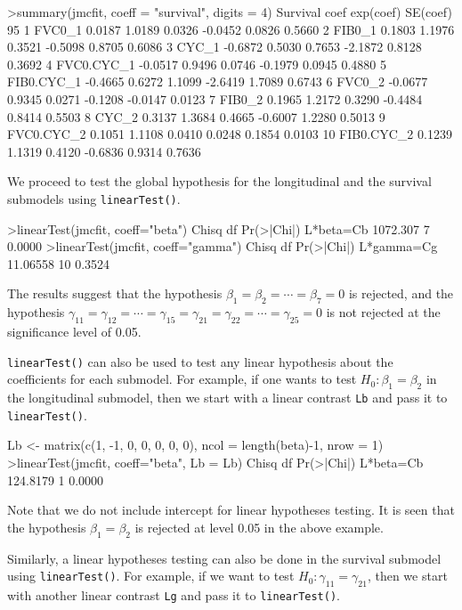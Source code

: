 \begin{example}
>summary(jmcfit, coeff = "survival", digits = 4)
     Survival    coef exp(coef) SE(coef) 95%
1      FVC0_1  0.0187    1.0189   0.0326  -0.0452   0.0826   0.5660
2      FIB0_1  0.1803    1.1976   0.3521  -0.5098   0.8705   0.6086
3       CYC_1 -0.6872    0.5030   0.7653  -2.1872   0.8128   0.3692
4  FVC0.CYC_1 -0.0517    0.9496   0.0746  -0.1979   0.0945   0.4880
5  FIB0.CYC_1 -0.4665    0.6272   1.1099  -2.6419   1.7089   0.6743
6      FVC0_2 -0.0677    0.9345   0.0271  -0.1208  -0.0147   0.0123
7      FIB0_2  0.1965    1.2172   0.3290  -0.4484   0.8414   0.5503
8       CYC_2  0.3137    1.3684   0.4665  -0.6007   1.2280   0.5013
9  FVC0.CYC_2  0.1051    1.1108   0.0410   0.0248   0.1854   0.0103
10 FIB0.CYC_2  0.1239    1.1319   0.4120  -0.6836   0.9314   0.7636
\end{example}

We proceed to test the global hypothesis for the longitudinal and the survival submodels using
\texttt{linearTest()}.
\begin{example}
>linearTest(jmcfit, coeff="beta")
             Chisq df Pr(>|Chi|)
L*beta=Cb 1072.307  7 0.0000
>linearTest(jmcfit, coeff="gamma")
              Chisq df Pr(>|Chi|)
L*gamma=Cg 11.06558 10 0.3524
\end{example}
The results suggest that the hypothesis $\beta_1=\beta_2=\cdots=\beta_7=0$ is rejected, and the hypothesis $\gamma_{11}=\gamma_{12}=\cdots=
\gamma_{15} = \gamma_{21}=\gamma_{22}=\cdots=\gamma_{25}=0$ is not rejected at the significance level of 0.05.

\texttt{linearTest()} can also be used to test any linear hypothesis about the coefficients for each submodel. For example, if one wants to test $H_0 : \beta_1 = \beta_2$ in the longitudinal submodel, then we start with a linear contrast \texttt{Lb} and pass it to \texttt{linearTest()}.

\begin{example}
Lb <- matrix(c(1, -1, 0, 0, 0, 0, 0), ncol = length(beta)-1, nrow = 1)
>linearTest(jmcfit, coeff="beta", Lb = Lb)
             Chisq df Pr(>|Chi|)
L*beta=Cb 124.8179  1 0.0000
\end{example}

Note that we do not include intercept for linear hypotheses testing. It is seen that the hypothesis $\beta_1 = \beta_2$ is rejected at level 0.05 in the above example.

Similarly, a linear hypotheses testing can also be done in the survival submodel using \texttt{linearTest()}. For example, if we want to test $H_0: \gamma_{11} = \gamma_{21}$, then we start with another linear contrast \texttt{Lg} and pass it to \texttt{linearTest()}.

